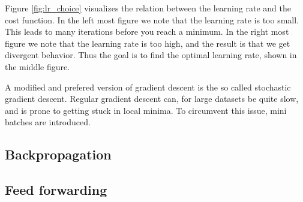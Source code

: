 Figure \ref{fig:lr_choice} visualizes the relation between the learning rate and the cost function. In the left most figure we note that the learning rate is too small. 
This leads to many iterations before you reach a minimum. In the right most figure we note that the learning rate is too high, and the result is that we get divergent behavior. 
Thus the goal is to find the optimal learning rate, shown in the middle figure. \par 
A modified and prefered version of gradient descent is the so called stochastic gradient descent. Regular gradient descent can, for large datasets be quite slow, and is prone to 
getting stuck in local minima. To circumvent this issue, mini batches are introduced. 






\subsection*{Backpropagation}

\subsection*{Feed forwarding}
